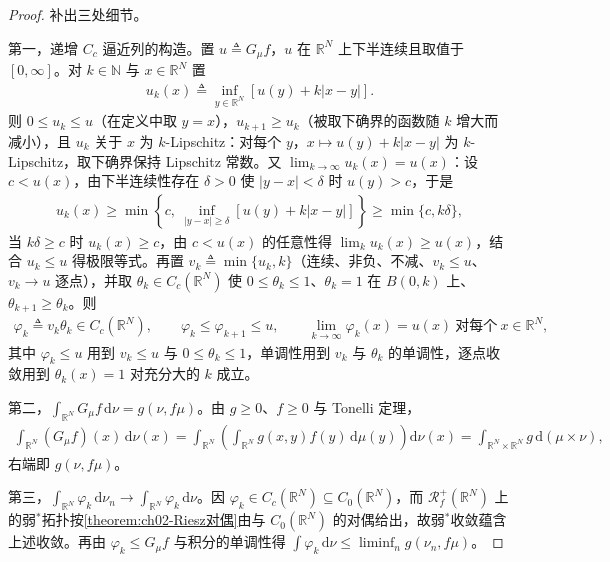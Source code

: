 \documentclass[../../main.tex]{subfiles}%
\begin{document}
\begin{proof}
补出三处细节。

第一，递增 $C_c$ 逼近列的构造。置 $u\triangleq G_\mu f$，$u$ 在 $\mathbb{R}^N$ 上下半连续且取值于 $[0,\infty]$。对 $k\in\mathbb{N}$ 与 $x\in\mathbb{R}^N$ 置
\begin{align*}
u_k(x)\triangleq\inf_{y\in\mathbb{R}^N}\left[u(y)+k|x-y|\right].
\end{align*}
则 $0\leqslant u_k\leqslant u$（在定义中取 $y=x$），$u_{k+1}\geqslant u_k$（被取下确界的函数随 $k$ 增大而减小），且 $u_k$ 关于 $x$ 为 $k$-Lipschitz：对每个 $y$，$x\mapsto u(y)+k|x-y|$ 为 $k$-Lipschitz，取下确界保持 Lipschitz 常数。又 $\lim_{k\to\infty}u_k(x)=u(x)$：设 $c<u(x)$，由下半连续性存在 $\delta>0$ 使 $|y-x|<\delta$ 时 $u(y)>c$，于是
\begin{align*}
u_k(x)\geqslant\min\left\{c,\ \inf_{|y-x|\geqslant\delta}\left[u(y)+k|x-y|\right]\right\}\geqslant\min\{c,k\delta\},
\end{align*}
当 $k\delta\geqslant c$ 时 $u_k(x)\geqslant c$，由 $c<u(x)$ 的任意性得 $\lim_k u_k(x)\geqslant u(x)$，结合 $u_k\leqslant u$ 得极限等式。再置 $v_k\triangleq\min\{u_k,k\}$（连续、非负、不减、$v_k\leqslant u$、$v_k\to u$ 逐点），并取 $\theta_k\in C_c(\mathbb{R}^N)$ 使 $0\leqslant\theta_k\leqslant1$、$\theta_k=1$ 在 $B(0,k)$ 上、$\theta_{k+1}\geqslant\theta_k$。则
\begin{align*}
\varphi_k\triangleq v_k\theta_k\in C_c(\mathbb{R}^N),\qquad
\varphi_k\leqslant\varphi_{k+1}\leqslant u,\qquad
\lim_{k\to\infty}\varphi_k(x)=u(x)\ \text{对每个}\ x\in\mathbb{R}^N,
\end{align*}
其中 $\varphi_k\leqslant u$ 用到 $v_k\leqslant u$ 与 $0\leqslant\theta_k\leqslant1$，单调性用到 $v_k$ 与 $\theta_k$ 的单调性，逐点收敛用到 $\theta_k(x)=1$ 对充分大的 $k$ 成立。

第二，$\int_{\mathbb{R}^N}G_\mu f\,\mathrm{d}\nu=g(\nu,f\mu)$。由 $g\geqslant0$、$f\geqslant0$ 与 Tonelli 定理，
\begin{align*}
\int_{\mathbb{R}^N}(G_\mu f)(x)\,\mathrm{d}\nu(x)
=\int_{\mathbb{R}^N}\left(\int_{\mathbb{R}^N}g(x,y)f(y)\,\mathrm{d}\mu(y)\right)\mathrm{d}\nu(x)
=\int_{\mathbb{R}^N\times\mathbb{R}^N}g\,\mathrm{d}(\mu\times\nu),
\end{align*}
右端即 $g(\nu,f\mu)$。

第三，$\int_{\mathbb{R}^N}\varphi_k\,\mathrm{d}\nu_n\to\int_{\mathbb{R}^N}\varphi_k\,\mathrm{d}\nu$。因 $\varphi_k\in C_c(\mathbb{R}^N)\subseteq C_0(\mathbb{R}^N)$，而 $\mathscr{R}^+_f(\mathbb{R}^N)$ 上的弱$^*$拓扑按\cref{theorem:ch02-Riesz对偶}由与 $C_0(\mathbb{R}^N)$ 的对偶给出，故弱$^*$收敛蕴含上述收敛。再由 $\varphi_k\leqslant G_\mu f$ 与积分的单调性得 $\int\varphi_k\,\mathrm{d}\nu\leqslant\liminf_n g(\nu_n,f\mu)$。
\end{proof}
\end{document}
